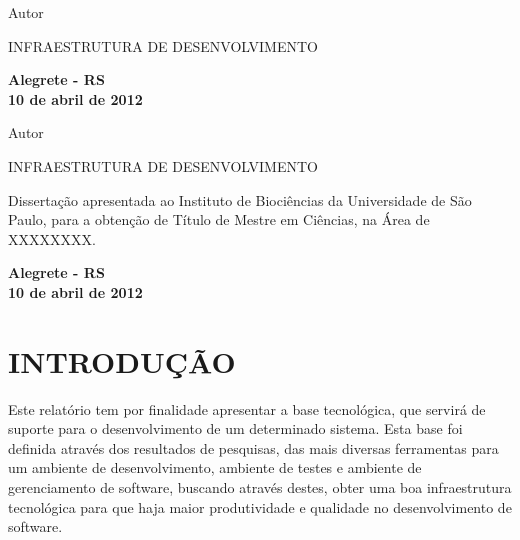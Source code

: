 \documentclass[12pt,a4paper]{article}
\begin{document}
\begin{titlepage}

\begin{center}
{\LARGE Autor}
\par
\vspace{200pt}
{\Huge INFRAESTRUTURA DE DESENVOLVIMENTO}
\par
\vfill
\textbf{{\large Alegrete - RS}\\
{\large 10 de abril de 2012}}
\end{center}
\end{titlepage}

\thispagestyle{empty}
\cleardoublepage

\begin{center}
{\LARGE Autor}
\par
\vspace{200pt}
{\Huge INFRAESTRUTURA DE DESENVOLVIMENTO}
\end{center}
\par
\vspace{90pt}
\hspace*{175pt}\parbox{7.6cm}{{\large Dissertação apresentada ao Instituto de Biociências da Universidade de São Paulo, para a obtenção de Título de Mestre em Ciências, na Área de XXXXXXXX.}}

\par
\vspace{1em}
\hspace*{175pt}\parbox{7.6cm}{{\large }}

\par
\vfill
\begin{center}
\textbf{{\large Alegrete - RS}\\
{\large 10 de abril de 2012}}
\end{center}

\thispagestyle{empty}
\clearpage
\thispagestyle{empty}
\tableofcontents
\thispagestyle{empty}
\clearpage

\section{INTRODUÇÃO}

	Este relatório tem por finalidade apresentar a base tecnológica, que servirá de suporte para o desenvolvimento de um determinado sistema. 
	Esta base foi definida através dos resultados de pesquisas, das mais diversas ferramentas para um ambiente de desenvolvimento, 
	ambiente de testes e ambiente de gerenciamento de software, buscando através destes, 
	obter uma boa infraestrutura tecnológica para que haja maior produtividade e qualidade no desenvolvimento de software.
\end{document}

